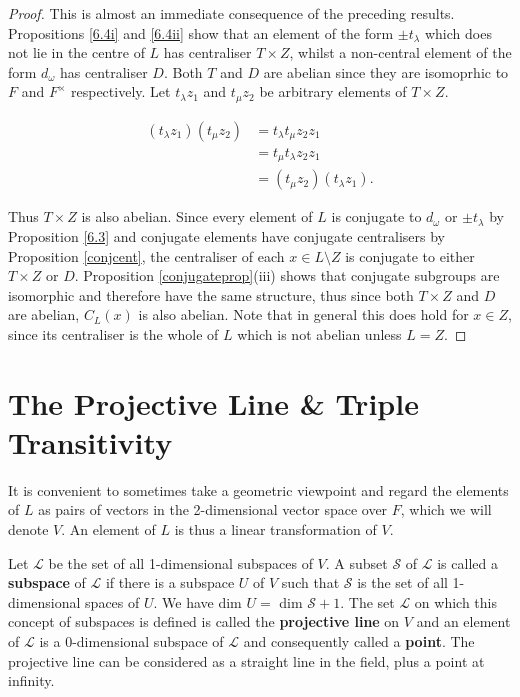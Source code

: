 \begin{proof} This is almost an immediate consequence of the preceding results. Propositions \ref{6.4i} and \ref{6.4ii} show that an element of the form $\pm t_\lambda$ which does not lie in the centre of $L$ has centraliser $T \times Z$, whilst a non-central element of the form $d_\omega$ has centraliser $D$. Both $T$ and $D$ are abelian since they are isomoprhic to $F$ and $F^\times$ respectively. Let $t_\lambda z_1$ and $t_\mu z_2$  be arbitrary elements of $T \times Z$.

\vspace{-.5mm}
\begin{align*} (t_\lambda z_1)(t_\mu z_2)  &= t_\lambda t_\mu z_2 z_1  \tag{since  $z_1 \in Z$}
\\ &= t_\mu t_\lambda z_2 z_1  \tag{since  $T$ is abelian}
\\ &= (t_\mu z_2)(t_\lambda z_1).   \tag{since  $z_2 \in Z$}
\end {align*} 

Thus $T \times Z$ is also abelian. Since every element of $L$ is conjugate to $d_\omega$ or $\pm t_\lambda$ by Proposition \ref{6.3} and conjugate elements have conjugate centralisers by Proposition \ref{conjcent}, the centraliser of each $x \in L \setminus Z$ is conjugate to either $T \times Z$ or $D$. Proposition \ref{conjugateprop}(iii) shows that conjugate subgroups are isomorphic and therefore have the same structure, thus since both $T \times Z$ and $D$ are abelian, $C_L(x)$ is also abelian. Note that in general this does hold for $x \in Z$, since its centraliser is the whole of $L$ which is not abelian unless $L = Z$.

\end{proof}

\section{The Projective Line \& Triple Transitivity}

It is convenient to sometimes take a geometric viewpoint and regard the elements of $L$ as pairs of vectors in the 2-dimensional vector space over $F$, which we will denote $V$. An element of $L$ is thus a linear transformation of $V$. 

\begin{definition} Let $\mathscr{L}$ be the set of all 1-dimensional subspaces of $V$. A subset $\mathscr{S}$ of $\mathscr{L}$ is called a \textbf{subspace} of $\mathscr{L}$ if there is a subspace $U$ of $V$ such that $\mathscr{S}$ is the set of all 1-dimensional spaces of $U$. We have dim $U =$ dim $\mathscr{S} + 1$. The set $\mathscr{L}$ on which this concept of subspaces is defined is called the \textbf{projective line} on $V$ and an element of $\mathscr{L}$ is a 0-dimensional subspace of $\mathscr{L}$ and consequently called a \textbf{point}. The projective line can be considered as a straight line in the field, plus a point at infinity.
\end{definition}

